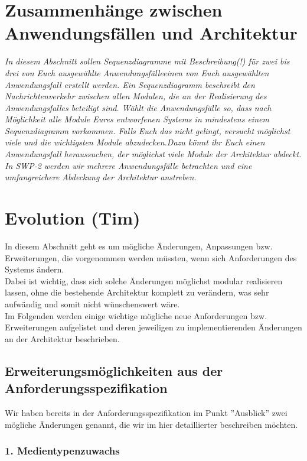 \documentclass[fontsize=12pt,paper=a4,twoside]{scrartcl}
\begin{document}
\section{Zusammenhänge zwischen Anwendungsfällen und Architektur}
\label{sec:anwendungsfaelle}

{\it In diesem Abschnitt sollen Sequenzdiagramme mit Beschreibung(!)
  für {zwei bis drei von Euch ausgewählte
    Anwendungsfälle}{einen von Euch ausgewählten Anwendungsfall}
  erstellt werden. Ein Sequenzdiagramm beschreibt den
  Nachrichtenverkehr zwischen allen Modulen, die an der Realisierung
  des Anwendungsfalles beteiligt sind.  {Wählt die
    Anwendungsfälle so, dass nach Möglichkeit alle Module Eures
    entworfenen Systems in mindestens einem Sequenzdiagramm
    vorkommen. Falls Euch das nicht gelingt, versucht möglichst viele
    und die wichtigsten Module abzudecken.}{Dazu könnt ihr Euch einen
    Anwendungsfall heraussuchen, der möglichst viele Module der
    Architektur abdeckt. In SWP-2 werden wir mehrere Anwendungsfälle
    betrachten und eine umfangreichere Abdeckung der Architektur
    anstreben.} }

\section{Evolution (Tim)}


\label{sec:evolution}

In diesem Abschnitt geht es um mögliche Änderungen, Anpassungen bzw. Erweiterungen, die vorgenommen werden müssten, wenn sich Anforderungen des Systems ändern. \\
Dabei ist wichtig, dass sich solche Änderungen möglichst modular realisieren lassen, ohne die bestehende Architektur komplett zu verändern, was sehr aufwändig und somit nicht wünschenswert wäre. \\
Im Folgenden werden einige wichtige mögliche neue Anforderungen bzw. Erweiterungen aufgelistet und deren jeweiligen zu implementierenden Änderungen an der Architektur beschrieben. 

\subsection*{Erweiterungsmöglichkeiten aus der Anforderungsspezifikation}

Wir haben bereits in der Anforderungsspezifikation im Punkt ''Ausblick'' zwei mögliche Änderungen genannt, die wir im hier detaillierter beschreiben möchten. 

\subsubsection*{1. Medientypenzuwachs}
\end{document}

